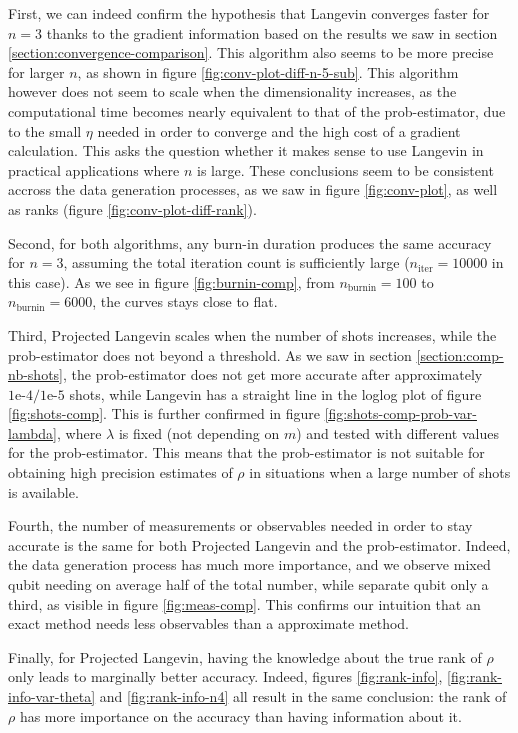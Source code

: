 \documentclass[12pt]{memoir}
\newcommand{\nitern}[1]{$n_{\text{iter}}=#1$}
\newcommand{\nburninn}[1]{$n_{\text{burnin}}=#1$}
\begin{document}
First, we can indeed confirm the hypothesis that Langevin converges faster for $n=3$ thanks to the gradient information based on the results we saw in section \ref{section:convergence-comparison}. This algorithm also seems to be more precise for larger $n$, as shown in figure \ref{fig:conv-plot-diff-n-5-sub}. This algorithm however does not seem to scale when the dimensionality increases, as the computational time becomes nearly equivalent to that of the prob-estimator, due to the small $\eta$ needed in order to converge and the high cost of a gradient calculation. This asks the question whether it makes sense to use Langevin in practical applications where $n$ is large. These conclusions seem to be consistent accross the data generation processes, as we saw in figure \ref{fig:conv-plot}, as well as ranks (figure \ref{fig:conv-plot-diff-rank}).\medbreak

Second, for both algorithms, any burn-in duration produces the same accuracy for $n=3$, assuming the total iteration count is sufficiently large (\nitern{10000} in this case). As we see in figure \ref{fig:burnin-comp}, from \nburninn{100} to \nburninn{6000}, the curves stays close to flat.\medbreak

Third, Projected Langevin scales when the number of shots increases, while the prob-estimator does not beyond a threshold. As we saw in section \ref{section:comp-nb-shots}, the prob-estimator does not get more accurate after approximately $1\text{e-}4/1\text{e-}5$ shots, while Langevin has a straight line in the loglog plot of figure \ref{fig:shots-comp}. This is further confirmed in figure \ref{fig:shots-comp-prob-var-lambda}, where $\lambda$ is fixed (not depending on $m$) and tested with different values for the prob-estimator. This means that the prob-estimator is not suitable for obtaining high precision estimates of $\rho$ in situations when a large number of shots is available.\medbreak

Fourth, the number of measurements or observables needed in order to stay accurate is the same for both Projected Langevin and the prob-estimator. Indeed, the data generation process has much more importance, and we observe mixed qubit needing on average half of the total number, while separate qubit only a third, as visible in figure \ref{fig:meas-comp}. This confirms our intuition that an exact method needs less observables than a approximate method.\medbreak

Finally, for Projected Langevin, having the knowledge about the true rank of $\rho$ only leads to marginally better accuracy. Indeed, figures \ref{fig:rank-info}, \ref{fig:rank-info-var-theta} and \ref{fig:rank-info-n4} all result in the same conclusion: the rank of $\rho$ has more importance on the accuracy than having information about it.
\end{document}
